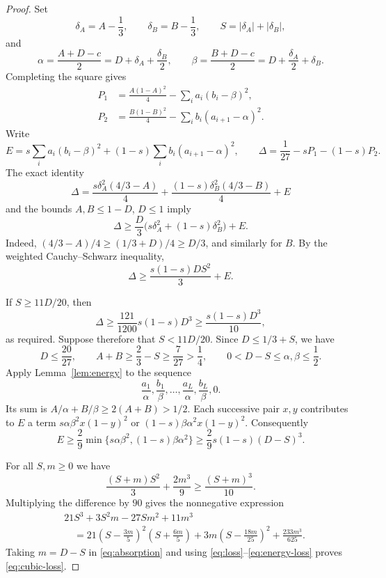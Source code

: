 \documentclass[11pt]{article}
\numberwithin{equation}{section}
\begin{document}
\begin{proof}
Set
\[
 \delta_A=A-\frac13,\qquad\delta_B=B-\frac13,
 \qquad S=|\delta_A|+|\delta_B|,
\]
and
\[
 \alpha=\frac{A+D-c}{2}=D+\delta_A+\frac{\delta_B}{2},
 \qquad
 \beta=\frac{B+D-c}{2}=D+\frac{\delta_A}{2}+\delta_B.
\]
Completing the square gives
\begin{align}
 P_1&=\frac{A(1-A)^2}{4}-\sum_i a_i(b_i-\beta)^2,
 \label{eq:square1}\\
 P_2&=\frac{B(1-B)^2}{4}-\sum_i b_i(a_{i+1}-\alpha)^2.
 \label{eq:square2}
\end{align}
Write
\[
 E=s\sum_i a_i(b_i-\beta)^2
 +(1-s)\sum_i b_i(a_{i+1}-\alpha)^2,
 \qquad
 \Delta=\frac1{27}-sP_1-(1-s)P_2.
\]
The exact identity
\[
 \Delta=\frac{s\delta_A^2(4/3-A)}4
 +\frac{(1-s)\delta_B^2(4/3-B)}4+E
\]
and the bounds \(A,B\le1-D\), \(D\le1\) imply
\[
 \Delta\ge\frac D3\bigl(s\delta_A^2+(1-s)\delta_B^2\bigr)+E.
\]
Indeed, \((4/3-A)/4\ge(1/3+D)/4\ge D/3\), and similarly for
\(B\). By the weighted Cauchy--Schwarz inequality,
\begin{equation}\label{eq:loss}
 \Delta\ge\frac{s(1-s)DS^2}{3}+E.
\end{equation}

If \(S\ge11D/20\), then
\[
 \Delta\ge\frac{121}{1200}s(1-s)D^3
 \ge\frac{s(1-s)D^3}{10},
\]
as required. Suppose therefore that \(S<11D/20\). Since
\(D\le1/3+S\), we have
\[
 D\le\frac{20}{27},\qquad
 A+B\ge\frac23-S\ge\frac7{27}>\frac14,
 \qquad 0<D-S\le\alpha,\beta\le\frac12.
\]
Apply Lemma~\ref{lem:energy} to the sequence
\[
 \frac{a_1}{\alpha},\frac{b_1}{\beta},\ldots,
 \frac{a_L}{\alpha},\frac{b_L}{\beta},0.
\]
Its sum is \(A/\alpha+B/\beta\ge2(A+B)>1/2\).
Each successive pair \(x,y\) contributes to \(E\) a term
\(s\alpha\beta^2x(1-y)^2\) or
\((1-s)\beta\alpha^2x(1-y)^2\). Consequently
\begin{equation}\label{eq:energy-loss}
 E\ge\frac29\min\{s\alpha\beta^2,(1-s)\beta\alpha^2\}
 \ge\frac29s(1-s)(D-S)^3.
\end{equation}

For all \(S,m\ge0\) we have
\begin{equation}\label{eq:absorption}
 \frac{(S+m)S^2}{3}+\frac{2m^3}{9}\ge\frac{(S+m)^3}{10}.
\end{equation}
Multiplying the difference by \(90\) gives the nonnegative expression
\begin{align*}
 &21S^3+3S^2m-27Sm^2+11m^3\\
 &\quad=21\left(S-\frac{3m}{5}\right)^2\left(S+\frac{6m}{5}\right)
 +3m\left(S-\frac{18m}{25}\right)^2+\frac{233m^3}{625}.
\end{align*}
Taking \(m=D-S\) in \eqref{eq:absorption} and using
\eqref{eq:loss}--\eqref{eq:energy-loss} proves \eqref{eq:cubic-loss}.
\end{proof}
\end{document}
